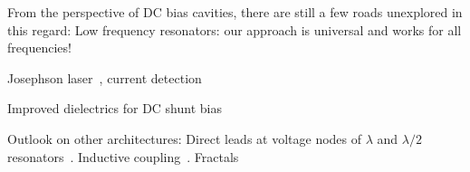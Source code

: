 
From the perspective of DC bias cavities, there are still a few roads unexplored in this regard:
%
Low frequency resonators: our approach is universal and works for all frequencies!

Josephson laser~\cite{chenRealizationSingleCooperpairJosephson2014c,cassidyDemonstrationAcJosephson2017e}, current detection~\cite{kherKineticInductanceParametric2016,kherSuperconductingNonlinearKinetic2017}

Improved dielectrics for DC shunt bias~\cite{adamyanTunableSuperconductingMicrostrip2016} %

Outlook on other architectures:
%
Direct leads at voltage nodes of $\lambda$ and $\lambda/2$ resonators~\cite{chenIntroductionDcBias2011a,liApplyingDirectCurrent2013}.
%
Inductive coupling~\cite{vissersFrequencytunableSuperconductingResonators2015b}.
%
Fractals~\cite{mahashabdeFastTunableHigh2020}

